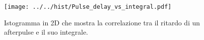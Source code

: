 \begin{figure}[h] \centering \texttt{[image: ../../hist/Pulse\_delay\_vs\_integral.pdf]}\caption{Istogramma in 2D che mostra la correlazione tra il ritardo di un afterpulse e il suo integrale.}\label{hist:Pulse_delay_vs_integral} \end{figure}
